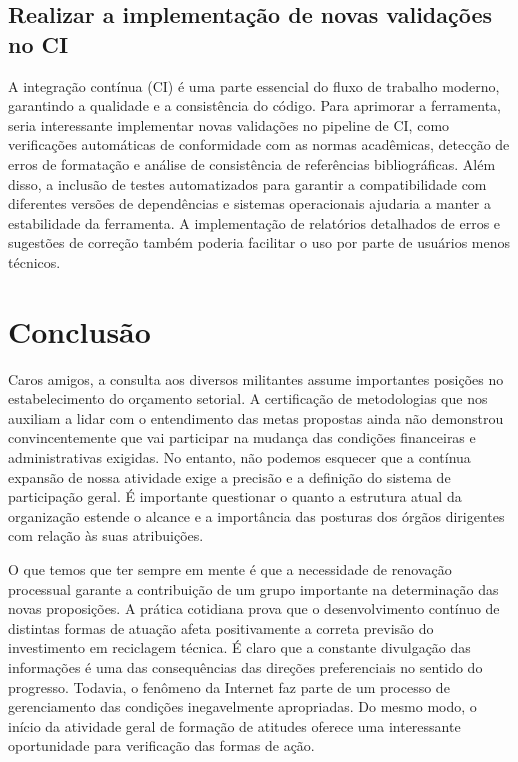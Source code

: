 \documentclass[
	12pt,				%
	oneside,			%
	a4paper,			%
	english,			%
	french,				%
	spanish,			%
	brazil				%
	]{abntex2}
\begin{document}
\hypertarget{realizar-a-implementauxe7uxe3o-de-novas-validauxe7uxf5es-no-ci}{%
\section{Realizar a implementação de novas validações no
CI}\label{realizar-a-implementauxe7uxe3o-de-novas-validauxe7uxf5es-no-ci}}

A integração contínua (CI) é uma parte essencial do fluxo de trabalho
moderno, garantindo a qualidade e a consistência do código. Para
aprimorar a ferramenta, seria interessante implementar novas validações
no pipeline de CI, como verificações automáticas de conformidade com as
normas acadêmicas, detecção de erros de formatação e análise de
consistência de referências bibliográficas. Além disso, a inclusão de
testes automatizados para garantir a compatibilidade com diferentes
versões de dependências e sistemas operacionais ajudaria a manter a
estabilidade da ferramenta. A implementação de relatórios detalhados de
erros e sugestões de correção também poderia facilitar o uso por parte
de usuários menos técnicos.

\hypertarget{conclusuxe3o}{%
\chapter{Conclusão}\label{conclusuxe3o}}

Caros amigos, a consulta aos diversos militantes assume importantes
posições no estabelecimento do orçamento setorial. A certificação de
metodologias que nos auxiliam a lidar com o entendimento das metas
propostas ainda não demonstrou convincentemente que vai participar na
mudança das condições financeiras e administrativas exigidas. No
entanto, não podemos esquecer que a contínua expansão de nossa atividade
exige a precisão e a definição do sistema de participação geral. É
importante questionar o quanto a estrutura atual da organização estende
o alcance e a importância das posturas dos órgãos dirigentes com relação
às suas atribuições.

O que temos que ter sempre em mente é que a necessidade de renovação
processual garante a contribuição de um grupo importante na determinação
das novas proposições. A prática cotidiana prova que o desenvolvimento
contínuo de distintas formas de atuação afeta positivamente a correta
previsão do investimento em reciclagem técnica. É claro que a constante
divulgação das informações é uma das consequências das direções
preferenciais no sentido do progresso. Todavia, o fenômeno da Internet
faz parte de um processo de gerenciamento das condições inegavelmente
apropriadas. Do mesmo modo, o início da atividade geral de formação de
atitudes oferece uma interessante oportunidade para verificação das
formas de ação.
\end{document}
